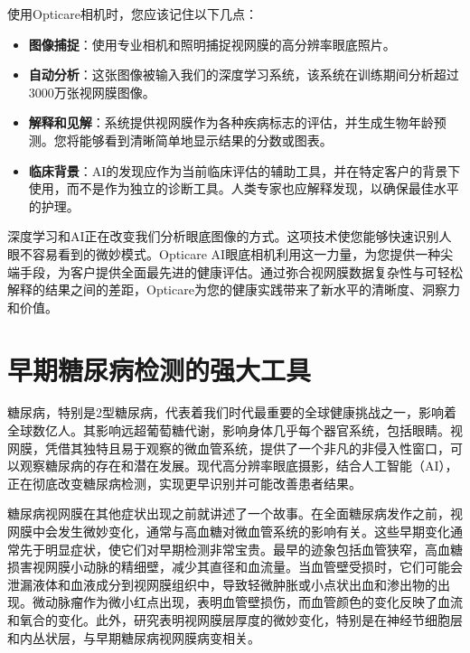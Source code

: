 \documentclass[
  Letterpaper,
]{scrbook}
\providecommand{\tightlist}{%
  \setlength{\itemsep}{0pt}\setlength{\parskip}{0pt}}\usepackage{longtable,booktabs,array}
\begin{document}
\begin{tcolorbox}[enhanced jigsaw, arc=.35mm, breakable, colbacktitle=quarto-callout-note-color!10!white, colback=white, toprule=.15mm, opacityback=0, left=2mm, titlerule=0mm, colframe=quarto-callout-note-color-frame, bottomrule=.15mm, toptitle=1mm, bottomtitle=1mm, rightrule=.15mm, leftrule=.75mm, coltitle=black, title=\textcolor{quarto-callout-note-color}{\faInfo}\hspace{0.5em}{了解过程}, opacitybacktitle=0.6]

使用Opticare相机时，您应该记住以下几点：

\begin{itemize}
\tightlist
\item
  \textbf{图像捕捉}：使用专业相机和照明捕捉视网膜的高分辨率眼底照片。
\item
  \textbf{自动分析}：这张图像被输入我们的深度学习系统，该系统在训练期间分析超过3000万张视网膜图像。
\item
  \textbf{解释和见解}：系统提供视网膜作为各种疾病标志的评估，并生成生物年龄预测。您将能够看到清晰简单地显示结果的分数或图表。
\item
  \textbf{临床背景}：AI的发现应作为当前临床评估的辅助工具，并在特定客户的背景下使用，而不是作为独立的诊断工具。人类专家也应解释发现，以确保最佳水平的护理。
\end{itemize}

\end{tcolorbox}

深度学习和AI正在改变我们分析眼底图像的方式。这项技术使您能够快速识别人眼不容易看到的微妙模式。Opticare
AI眼底相机利用这一力量，为您提供一种尖端手段，为客户提供全面最先进的健康评估。通过弥合视网膜数据复杂性与可轻松解释的结果之间的差距，Opticare为您的健康实践带来了新水平的清晰度、洞察力和价值。

\section{早期糖尿病检测的强大工具}\label{ux65e9ux671fux7cd6ux5c3fux75c5ux68c0ux6d4bux7684ux5f3aux5927ux5de5ux5177}

糖尿病，特别是2型糖尿病，代表着我们时代最重要的全球健康挑战之一，影响着全球数亿人。其影响远超葡萄糖代谢，影响身体几乎每个器官系统，包括眼睛。视网膜，凭借其独特且易于观察的微血管系统，提供了一个非凡的非侵入性窗口，可以观察糖尿病的存在和潜在发展。现代高分辨率眼底摄影，结合人工智能（AI），正在彻底改变糖尿病检测，实现更早识别并可能改善患者结果。

糖尿病视网膜在其他症状出现之前就讲述了一个故事。在全面糖尿病发作之前，视网膜中会发生微妙变化，通常与高血糖对微血管系统的影响有关。这些早期变化通常先于明显症状，使它们对早期检测非常宝贵。最早的迹象包括血管狭窄，高血糖损害视网膜小动脉的精细壁，减少其直径和血流量。当血管壁受损时，它们可能会泄漏液体和血液成分到视网膜组织中，导致轻微肿胀或小点状出血和渗出物的出现。微动脉瘤作为微小红点出现，表明血管壁损伤，而血管颜色的变化反映了血流和氧合的变化。此外，研究表明视网膜层厚度的微妙变化，特别是在神经节细胞层和内丛状层，与早期糖尿病视网膜病变相关。
\end{document}
